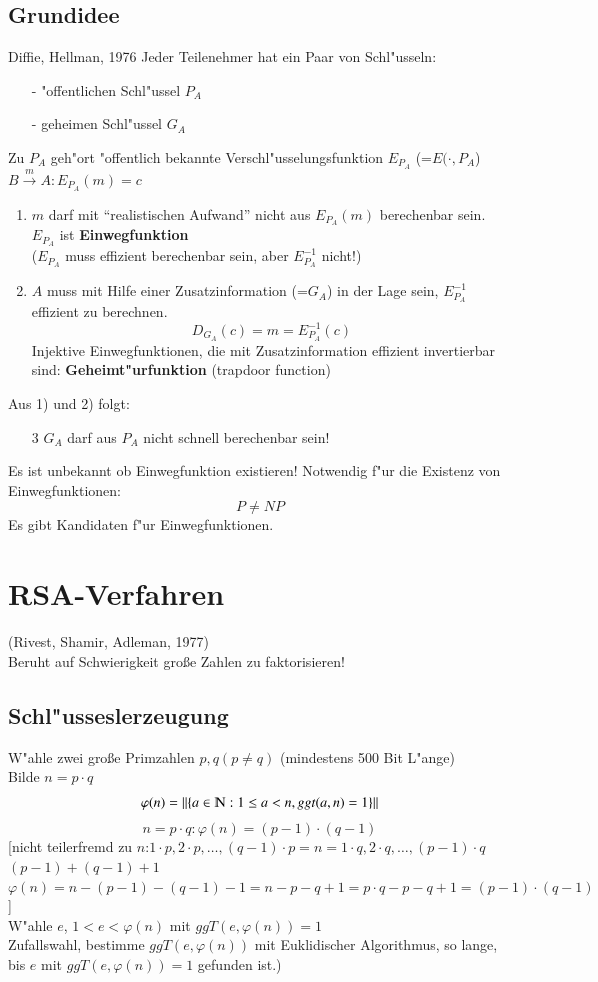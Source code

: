 \subsection{Grundidee}
Diffie, Hellman, 1976
Jeder Teilenehmer hat ein Paar von Schl"usseln:
\begin{itemize}
	\item[-] "offentlichen Schl"ussel $P_A$
	\item[-] geheimen Schl"ussel $G_A$
\end{itemize}
Zu $P_A$ geh"ort "offentlich bekannte Verschl"usselungsfunktion $E_{P_A}$ (=$E(\cdot, P_A$)\\
$B \xrightarrow{m} A: E_{P_A}(m)=c$
\begin{enumerate}
	\item $m$ darf mit "`realistischen Aufwand"' nicht aus $E_{P_A}(m)$ berechenbar sein. $E_{P_A}$ ist \textbf{Einwegfunktion}\\
	($E_{P_A}$ muss effizient berechenbar sein, aber $E_{P_A}^{-1}$ nicht!)
	\item $A$ muss mit Hilfe einer Zusatzinformation (=$G_A$) in der Lage sein, $E_{P_A}^{-1}$ effizient zu berechnen.
	\[
	D_{G_A}(c)=m=E_{P_A}^{-1}(c)
	\]
	Injektive Einwegfunktionen, die mit Zusatzinformation effizient invertierbar sind: \textbf{Geheimt"urfunktion} (trapdoor function)
\end{enumerate}

Aus 1) und 2) folgt:
\begin{enumerate}
	\item[3] $G_A$  darf aus $P_A$ nicht schnell berechenbar sein!
\end{enumerate}
Es ist unbekannt ob Einwegfunktion existieren! Notwendig f"ur die Existenz von Einwegfunktionen:
\[
	P\neq NP
\]
Es gibt Kandidaten f"ur Einwegfunktionen.

\section{RSA-Verfahren} (Rivest, Shamir, Adleman, 1977)
\\
Beruht auf Schwierigkeit gro\ss e Zahlen zu  faktorisieren!

\subsection{Schl"usseslerzeugung}
W"ahle zwei gro\ss e Primzahlen $p,q (p\neq q)$ (mindestens 500 Bit L"ange)\\
Bilde $n=p\cdot q$\\
\[
	\varphi(n)=\| \{a \in \N : 1 \leq a < n, ggt(a,n)=1\}\|
\]
\[
	n=p\cdot q : \varphi(n)=(p-1)\cdot (q-1)
\]
[nicht teilerfremd zu $n$:$1\cdot p, 2 \cdot p,\ldots,(q-1)\cdot p = n = 1\cdot q, 2\cdot q,\ldots,(p-1)\cdot q$\\
$(p-1)+(q-1)+1$\\
$\varphi(n)=n-(p-1)-(q-1)-1=n-p-q+1=p\cdot q - p-q + 1 = (p-1)\cdot (q-1)$]\\
W"ahle $e$, $1 < e < \varphi(n)$ mit $ggT(e,\varphi(n))=1$\\
Zufallswahl, bestimme $ggT(e,\varphi(n))$ mit Euklidischer Algorithmus, so lange, bis $e$ mit $ggT(e,\varphi(n))=1$ gefunden ist.)
